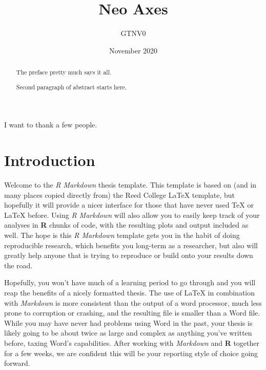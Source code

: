 \documentclass[12pt,msc,a4paper,twoside]{ucl_thesis}
\title{Neo Axes}
\author{GTNV0}
\date{November 2020}
\begin{document}

      \maketitle
  
\makedeclaration
      \begin{abstract}
      The preface pretty much says it all.
      
      \par
      
      Second paragraph of abstract starts here.
    \end{abstract}
      \begin{acknowledgements}
      I want to thank a few people.
    \end{acknowledgements}
      \hypersetup{linkcolor=black}
   \setcounter{tocdepth}{2} 
    \tableofcontents
  
     \listoffigures
  
      \listoftables
  


  \hypertarget{introduction}{%
  \chapter*{Introduction}\label{introduction}}
  
  Welcome to the \emph{R Markdown} thesis template. This template is based on (and in many places copied directly from) the Reed College LaTeX template, but hopefully it will provide a nicer interface for those that have never used TeX or LaTeX before. Using \emph{R Markdown} will also allow you to easily keep track of your analyses in \textbf{R} chunks of code, with the resulting plots and output included as well. The hope is this \emph{R Markdown} template gets you in the habit of doing reproducible research, which benefits you long-term as a researcher, but also will greatly help anyone that is trying to reproduce or build onto your results down the road.
  
  Hopefully, you won't have much of a learning period to go through and you will reap the benefits of a nicely formatted thesis. The use of LaTeX in combination with \emph{Markdown} is more consistent than the output of a word processor, much less prone to corruption or crashing, and the resulting file is smaller than a Word file. While you may have never had problems using Word in the past, your thesis is likely going to be about twice as large and complex as anything you've written before, taxing Word's capabilities. After working with \emph{Markdown} and \textbf{R} together for a few weeks, we are confident this will be your reporting style of choice going forward.
  
\end{document}
